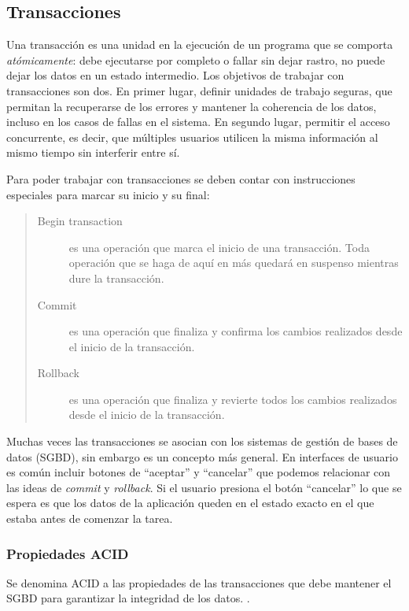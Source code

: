 \subsection{Transacciones}	

Una transacción es una unidad en la ejecución de un programa que se comporta 
\emph{atómicamente}: debe ejecutarse por completo o fallar sin dejar rastro, no
puede dejar los datos en un estado intermedio.
Los objetivos de trabajar con transacciones son dos.
En primer lugar, definir unidades de trabajo seguras, que permitan la
recuperarse de los errores y mantener la coherencia de los datos, incluso en
los casos de fallas en el sistema.
En segundo lugar, permitir el acceso concurrente, es decir, que múltiples
usuarios utilicen la misma información al mismo tiempo sin interferir entre sí.

Para poder trabajar con transacciones se deben contar con instrucciones
especiales para marcar su inicio y su final:
\begin{quote}
	\label{ctxTransactional}
	\begin{description}
		\item[Begin transaction] es una operación que marca el inicio de una
		transacción. Toda operación que se haga de aquí en más quedará en suspenso
		mientras dure la transacción.
	
		\item[Commit] es una operación que finaliza y confirma los
		cambios realizados desde el inicio de la transacción. 
		
		\item[Rollback] es una operación que finaliza y revierte todos los cambios
		realizados desde el inicio de la transacción.
	\end{description}
\end{quote}
   
\bigskip

Muchas veces las transacciones se asocian con los sistemas de gestión de bases
de datos (SGBD), sin embargo es un concepto más general.
En interfaces de usuario es común incluir botones de
``aceptar'' y ``cancelar'' que podemos relacionar con las ideas de
\emph{commit} y \emph{rollback}. 
Si el usuario presiona el botón ``cancelar'' lo que se espera
es que los datos de la aplicación queden en el estado exacto en el que estaba
antes de comenzar la tarea.

\bigskip

\subsubsection{Propiedades ACID}
\label{sec:ACID}
Se denomina ACID a las propiedades de las transacciones que debe mantener el
SGBD para garantizar la integridad de los datos. \cite{HaerderReuter83}.

